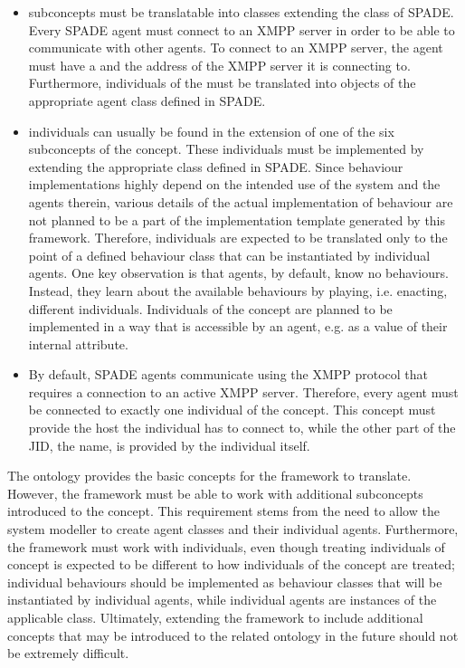 \begin{itemize}
    \item {} subconcepts must be translatable into classes extending the  class of \ac{SPADE}. Every \ac{SPADE} agent must connect to an \ac{XMPP} server in order to be able to communicate with other agents. To connect to an \ac{XMPP} server, the agent must have a  and the address of the \ac{XMPP} server it is connecting to. Furthermore, individuals of the  must be translated into objects of the appropriate agent class defined in \ac{SPADE}.

    \item {} individuals can usually be found in the extension of one of the six subconcepts of the  concept. These individuals must be implemented by extending the appropriate class defined in \ac{SPADE}. Since behaviour implementations highly depend on the intended use of the system and the agents therein, various details of the actual implementation of behaviour are not planned to be a part of the implementation template generated by this framework. Therefore,  individuals are expected to be translated only to the point of a defined behaviour class that can be instantiated by individual agents. One key observation is that agents, by default, know no behaviours. Instead, they learn about the available behaviours by playing, i.e. enacting, different  individuals. Individuals of the  concept are planned to be implemented in a way that is accessible by an agent, e.g. as a value of their internal attribute.

    \item By default, \ac{SPADE} agents communicate using the \ac{XMPP} protocol that requires a connection to an active \ac{XMPP} server. Therefore, every agent must be connected to exactly one individual of the  concept. This concept must provide the host the  individual has to connect to, while the other part of the \ac{JID}, the name, is provided by the  individual itself.
\end{itemize}

The \magoontologyname ontology provides the basic concepts for the framework to translate. However, the framework must be able to work with additional subconcepts introduced to the  concept. This requirement stems from the need to allow the system modeller to create agent classes and their individual agents. Furthermore, the \magoontologyname framework must work with individuals, even though treating individuals of  concept is expected to be different to how individuals of the  concept are treated; individual behaviours should be implemented as behaviour classes that will be instantiated by individual agents, while individual agents are instances of the applicable  class. Ultimately, extending the framework to include additional concepts that may be introduced to the related ontology in the future should not be extremely difficult.

